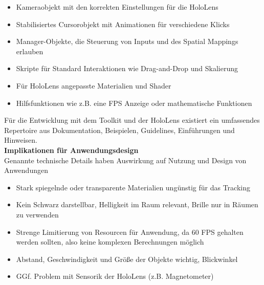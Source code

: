 \begin{itemize}
	\item Kameraobjekt mit den korrekten Einstellungen für die HoloLens
	\item Stabilisiertes Cursorobjekt mit Animationen für verschiedene Klicks
	\item Manager-Objekte, die Steuerung von Inputs und des Spatial Mappings erlauben
	\item Skripte für Standard Interaktionen wie Drag-and-Drop und Skalierung
	\item Für HoloLens angepasste Materialien und Shader
	\item Hilfsfunktionen wie z.B. eine FPS Anzeige oder mathematische Funktionen
\end{itemize}

Für die Entwicklung mit dem Toolkit und der HoloLens existiert ein umfassendes Repertoire aus Dokumentation, Beispielen, Guidelines, Einführungen und Hinweisen.\\


\textbf{Implikationen für Anwendungsdesign}\\
Genannte technische Details haben Auswirkung auf Nutzung und Design von Anwendungen
\begin{itemize}
	\item Stark spiegelnde oder transparente Materialien ungünstig für das Tracking
	\item Kein Schwarz darstellbar, Helligkeit im Raum relevant, Brille nur in Räumen zu verwenden
	\item Strenge Limitierung von Resourcen für Anwendung, da 60 FPS gehalten werden sollten, also keine komplexen Berechnungen möglich
	\item Abstand, Geschwindigkeit und Größe der Objekte wichtig, Blickwinkel
	\item GGf. Problem mit Sensorik der HoloLens (z.B. Magnetometer)
\end{itemize}
